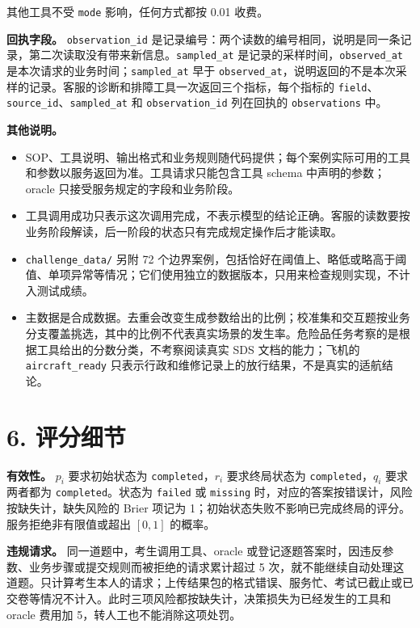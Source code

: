 \documentclass[11pt,a4paper]{article}
\providecommand{\tightlist}{\setlength{\itemsep}{3pt}\setlength{\parskip}{0pt}}
\begin{document}
其他工具不受 \texttt{mode} 影响，任何方式都按 0.01 收费。

\textbf{回执字段。} \texttt{observation\_id}
是记录编号：两个读数的编号相同，说明是同一条记录，第二次读取没有带来新信息。\texttt{sampled\_at}
是记录的采样时间，\texttt{observed\_at}
是本次请求的业务时间；\texttt{sampled\_at} 早于
\texttt{observed\_at}，说明返回的不是本次采样的记录。客服的诊断和排障工具一次返回三个指标，每个指标的
\texttt{field}、\texttt{source\_id}、\texttt{sampled\_at} 和
\texttt{observation\_id} 列在回执的 \texttt{observations} 中。

\textbf{其他说明。}

\begin{itemize}
\tightlist
\item
  SOP、工具说明、输出格式和业务规则随代码提供；每个案例实际可用的工具和参数以服务返回为准。工具请求只能包含工具
  schema 中声明的参数；oracle 只接受服务规定的字段和业务阶段。
\item
  工具调用成功只表示这次调用完成，不表示模型的结论正确。客服的读数要按业务阶段解读，后一阶段的状态只有完成规定操作后才能读取。
\item
  \texttt{challenge\_data/} 另附 72
  个边界案例，包括恰好在阈值上、略低或略高于阈值、单项异常等情况；它们使用独立的数据版本，只用来检查规则实现，不计入测试成绩。
\item
  主数据是合成数据。去重会改变生成参数给出的比例；校准集和交互题按业务分支覆盖挑选，其中的比例不代表真实场景的发生率。危险品任务考察的是根据工具给出的分数分类，不考察阅读真实
  SDS 文档的能力；飞机的 \texttt{aircraft\_ready}
  只表示行政和维修记录上的放行结果，不是真实的适航结论。
\end{itemize}

\section{6. 评分细节}\label{ux8bc4ux5206ux7ec6ux8282}

\textbf{有效性。} \(p_i\) 要求初始状态为 \texttt{completed}，\(r_i\)
要求终局状态为 \texttt{completed}，\(q_i\) 要求两者都为
\texttt{completed}。状态为 \texttt{failed} 或 \texttt{missing}
时，对应的答案按错误计，风险按缺失计，缺失风险的 Brier 项记为
1；初始状态失败不影响已完成终局的评分。服务拒绝非有限值或超出 \([0,1]\)
的概率。

\textbf{违规请求。} 同一道题中，考生调用工具、oracle
或登记逐题答案时，因违反参数、业务步骤或提交规则而被拒绝的请求累计超过 5
次，就不能继续自动处理这道题。只计算考生本人的请求；上传结果包的格式错误、服务忙、考试已截止或已交卷等情况不计入。此时三项风险都按缺失计，决策损失为已经发生的工具和
oracle 费用加 5，转人工也不能消除这项处罚。
\end{document}
